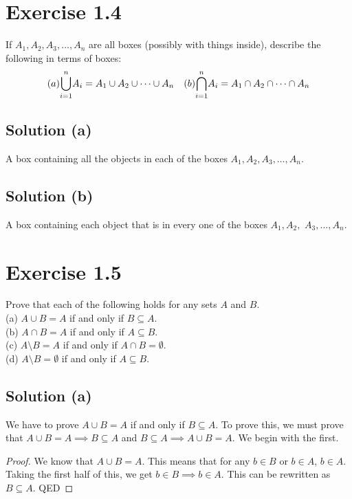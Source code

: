 \documentclass[12pt]{report}
\begin{document}
\pagebreak
\section{Exercise 1.4}
If $A_1, A_2, A_3, \dots, A_n$ are all boxes (possibly with things inside), describe the following in terms of boxes:
\begin{align*}
    &(a) \overunderset{n}{i = 1}{\bigcup} A_i = A_1 \cup A_2 \cup \dots \cup A_n
    &(b) \overunderset{n}{i = 1}{\bigcap} A_i = A_1 \cap A_2 \cap \dots \cap A_n
\end{align*}

\subsection{Solution (a)}
A box containing all the objects in each of the boxes $A_1, A_2, A_3, \dots, A_n$.

\subsection{Solution (b)}
A box containing each object that is in every one of the boxes $A_1, A_2,$ $A_3, \dots, A_n$.

\pagebreak
\section{Exercise 1.5}
Prove that each of the following holds for any sets $A$ and $B$.\\
(a) $A \cup B = A$ if and only if $B \subseteq A$.\\
(b) $A \cap B = A$ if and only if $A \subseteq B$.\\
(c) $A \setminus B = A$ if and only if $A \cap B = \emptyset$.\\
(d) $A \setminus B = \emptyset$ if and only if $A \subseteq B$.

\subsection{Solution (a)}
We have to prove $A \cup B = A$ if and only if $B \subseteq A$.
To prove this, we must prove that $A \cup B = A \implies B \subseteq A$ and $B \subseteq A \implies A \cup B = A$.
We begin with the first. 
\begin{proof}
    We know that $A \cup B = A$.
    This means that for any $b \in B$ or $b \in A$, $b \in A$. 
    Taking the first half of this, we get $b \in B \implies b \in A$.
    This can be rewritten as $B \subseteq A$. 
    QED
\end{proof}
\end{document}
